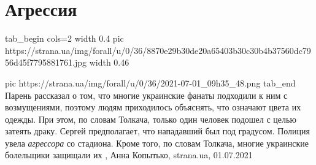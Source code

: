  
 
 
 
 
\chapter{Агрессия}
\label{sec:slova.agressia}

\ifcmt
  tab_begin cols=2
		width 0.4
     pic https://strana.ua/img/forall/u/0/36/8870e29b30de20a65403b30c30b4b37560dc7956d45f7795881761.jpg
		width 0.46

     pic https://strana.ua/img/forall/u/0/36/2021-07-01_09h35_48.png
  tab_end
\fi
Парень рассказал о том, что многие украинские фанаты подходили к ним с
возмущениями, поэтому людям приходилось объяснять, что означают цвета их
одежды. При этом, по словам Толкача, только один человек подошел с целью
затеять драку. Сергей предполагает, что нападавший был под градусом.
Полиция увела \emph{агрессора} со стадиона.
Кроме того, по словам Толкача, многие украинские болельщики защищали их
, 
Анна Копытько, strana.ua, 01.07.2021
